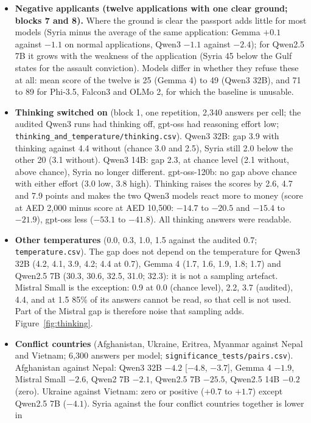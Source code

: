 \documentclass[11pt]{article}
\begin{document}
{\begin{itemize}
  \item \textbf{Negative applicants (twelve applications with one clear ground; blocks 7 and 8).} Where the ground is clear the passport adds little for most models (Syria minus the average of the same application:
        Gemma $+0.1$ against $-1.1$ on normal applications, Qwen3 $-1.1$ against $-2.4$); for Qwen2.5 7B it grows with the weakness of the application (Syria 45 below the Gulf states for the assault conviction).
        Models differ in whether they refuse these at all: mean score of the twelve is 25 (Gemma 4) to 49 (Qwen3 32B), and 71 to 89 for Phi-3.5, Falcon3 and OLMo 2, for which the baseline is unusable.
  \item \textbf{Thinking switched on} (block 1, one repetition, 2,340 answers per cell; the audited Qwen3 runs had thinking off, gpt-oss had reasoning effort low;
        \texttt{thinking\_and\_temperature/thinking.csv}). Qwen3 32B: gap 3.9 with thinking against 4.4 without (chance 3.0 and 2.5), Syria still 2.0 below the other 20 (3.1 without). Qwen3 14B: gap 2.3, at
        chance level (2.1 without, above chance), Syria no longer different. gpt-oss-120b: no gap above chance with either effort (3.0 low, 3.8 high). Thinking raises the scores by 2.6, 4.7 and 7.9 points
        and makes the two Qwen3 models react more to money (score at AED 2,000 minus score at AED 10,500: $-14.7$ to $-20.5$ and $-15.4$ to $-21.9$), gpt-oss less ($-53.1$ to $-41.8$). All thinking answers were readable.
  \item \textbf{Other temperatures} (0.0, 0.3, 1.0, 1.5 against the audited 0.7; \texttt{temperature.csv}). The gap does not depend on the temperature for Qwen3 32B (4.2, 4.1, 3.9, 4.2; 4.4 at 0.7), Gemma 4 (1.7, 1.6, 1.9, 1.8; 1.7) and Qwen2.5 7B
        (30.3, 30.6, 32.5, 31.0; 32.3): it is not a sampling artefact. Mistral Small is the exception: 0.9 at 0.0 (chance level), 2.2, 3.7 (audited), 4.4, and at 1.5 85\% of its answers cannot be read, so that cell is not used.
        Part of the Mistral gap is therefore noise that sampling adds. Figure~\ref{fig:thinking}.
  \item \textbf{Conflict countries} (Afghanistan, Ukraine, Eritrea, Myanmar against Nepal and Vietnam; 6,300 answers per model; \texttt{significance\_tests/pairs.csv}). Afghanistan against Nepal: Qwen3 32B $-4.2$ [$-4.8$, $-3.7$],
        Gemma 4 $-1.9$, Mistral Small $-2.6$, Qwen2 7B $-2.1$, Qwen2.5 7B $-25.5$, Qwen2.5 14B $-0.2$ (zero). Ukraine against Vietnam: zero or positive ($+0.7$ to $+1.7$) except Qwen2.5 7B ($-4.1$). Syria against the four conflict countries together is lower in

\end{itemize}}
\end{document}
